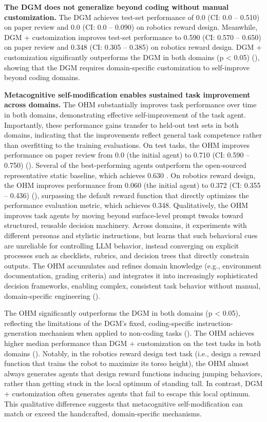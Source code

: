 \documentclass[]{fairmeta}
\begin{document}
\textbf{The DGM does not generalize beyond coding without manual customization.} The DGM achieves test-set performance of 0.0 (CI: 0.0 -- 0.510) on paper review and 0.0 (CI: 0.0 -- 0.090) on robotics reward design. Meanwhile, DGM + customization improves test-set performance to 0.590 (CI: 0.570 -- 0.650) on paper review and 0.348 (CI: 0.305 -- 0.385) on robotics reward design. DGM + customization significantly outperforms the DGM in both domains (p < 0.05) (), showing that the DGM requires domain-specific customization to self-improve beyond coding domains.

\textbf{Metacognitive self-modification enables sustained task improvement across domains.} The OHM substantially improves task performance over time in both domains, demonstrating effective self-improvement of the task agent. Importantly, these performance gains transfer to held-out test sets in both domains, indicating that the improvements reflect general task competence rather than overfitting to the training evaluations. On test tasks, the OHM improves performance on paper review from 0.0 (the initial agent) to 0.710 (CI: 0.590 -- 0.750) (). Several of the best-performing agents outperform the open-sourced representative static baseline, which achieves 0.630 \citep{yamada2025ai}. On robotics reward design, the OHM improves performance from 0.060 (the initial agent) to 0.372 (CI: 0.355 -- 0.436) (), surpassing the default reward function that directly optimizes the performance evaluation metric, which achieves 0.348.
Qualitatively, the OHM improves task agents by moving beyond surface-level prompt tweaks toward structured, reusable decision machinery. Across domains, it experiments with different personas and stylistic instructions, but learns that such behavioral cues are unreliable for controlling LLM behavior, instead converging on explicit processes such as checklists, rubrics, and decision trees that directly constrain outputs. The OHM accumulates and refines domain knowledge (e.g., environment documentation, grading criteria) and integrates it into increasingly sophisticated decision frameworks, enabling complex, consistent task behavior without manual, domain-specific engineering ().

The OHM significantly outperforms the DGM in both domains (p < 0.05), reflecting the limitations of the DGM's fixed, coding-specific instruction-generation mechanism when applied to non-coding tasks (). The OHM achieves higher median performance than DGM + customization on the test tasks in both domains (). Notably, in the robotics reward design test task (i.e., design a reward function that trains the robot to maximize its torso height), the OHM almost always generates agents that design reward functions inducing jumping behaviors, rather than getting stuck in the local optimum of standing tall. In contrast, DGM + customization often generates agents that fail to escape this local optimum. This qualitative difference suggests that metacognitive self-modification can match or exceed the handcrafted, domain-specific mechanisms.
\end{document}
